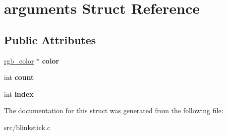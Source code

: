 \hypertarget{structarguments}{}\section{arguments Struct Reference}
\label{structarguments}
\subsection*{Public Attributes}
\begin{DoxyCompactItemize}
\item 
\mbox{\label{structarguments_a43a571bd7c0dc30e0efcbd17ac4054a7}} 
\hyperlink{structrgb__color}{rgb\+\_\+color} $\ast$ {\bfseries color}
\item 
\mbox{\label{structarguments_aed87526922d7dc35bd4030561e3543ca}} 
int {\bfseries count}
\item 
\mbox{\label{structarguments_ae49f614707fea7e9a8fb5e04dadb201d}} 
int {\bfseries index}
\end{DoxyCompactItemize}


The documentation for this struct was generated from the following file\+:\begin{DoxyCompactItemize}
\item 
src/blinkstick.\+c\end{DoxyCompactItemize}
